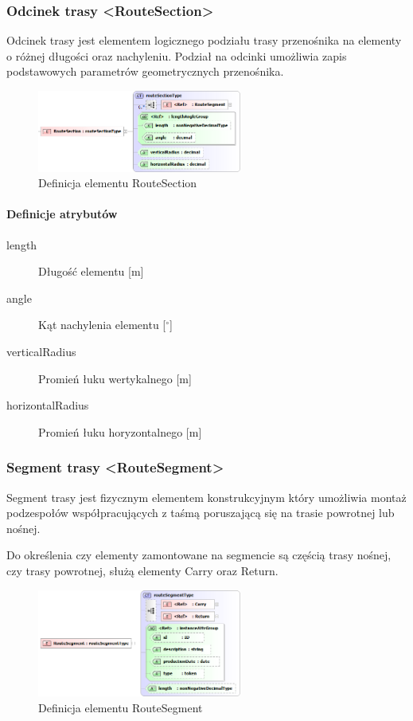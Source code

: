 \documentclass[12pt,a4paper]{article}
\begin{document}
\subsubsection{Odcinek trasy <RouteSection>}
Odcinek trasy jest elementem logicznego podziału trasy przenośnika na elementy o
różnej długości oraz nachyleniu. Podział na odcinki umożliwia zapis podstawowych
parametrów geometrycznych przenośnika.

\begin{figure}[h]
  \centering
  \includegraphics[width=0.6\textwidth]{png/liquid/RouteSection}
  \caption{Definicja elementu RouteSection}
  \label{fig:routeSection-xsd}
\end{figure}

\paragraph{Definicje atrybutów}
\begin{description}
\item[length] Długość elementu [m]
\item[angle] Kąt nachylenia elementu [$^\circ$]
\item[verticalRadius] Promień łuku wertykalnego [m]
\item[horizontalRadius] Promień łuku horyzontalnego [m]
\end{description}


\subsubsection{Segment trasy <RouteSegment>}
Segment trasy jest fizycznym elementem konstrukcyjnym który umożliwia montaż
podzespołów współpracujących z taśmą poruszającą się na trasie powrotnej lub
nośnej.

Do określenia czy elementy zamontowane na segmencie są częścią trasy nośnej, czy
trasy powrotnej, służą elementy Carry oraz Return.

\begin{figure}[h]
  \centering
  \includegraphics[width=0.6\textwidth]{png/liquid/RouteSegment}
  \caption{Definicja elementu RouteSegment}
  \label{fig:routeSegment-xsd}
\end{figure}
\end{document}
